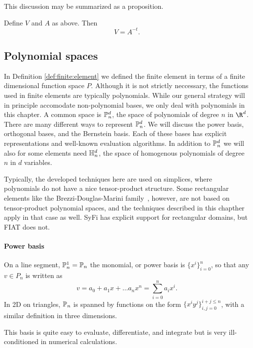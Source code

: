 This discussion may be summarized as a proposition.
\begin{proposition}
Define \( V \) and \( A \) as above.  Then
\begin{equation}
V = A^{-t}.
\end{equation}
\end{proposition}

\subsection{Polynomial spaces}
In Definition \ref{def:finite:element} we defined the finite element in terms
of a finite dimensional function space $P$. Although it is not strictly
neccessary,
the functions used in finite elements are typically polynomials.
While our general strategy will in principle accomodate non-polynomial bases, we
only deal with polynomials in this chapter.
A common space is
$\P_n^d$, the space of polynomials of degree $n$ in $\R^d$. There
are many different ways to represent $\P^d_n$. We will discuss the power
basis, orthogonal bases, and the Bernstein basis.  Each of these bases
has explicit representations and well-known evaluation algorithms.
In addition to $\P^d_n$ we will also for some
elements need $\H^d_n$, the space of homogenous polynomials of degree
\( n \) in \( d \) variables.

Typically, the developed techniques here
are used on simplices, where polynomials do not have a nice
tensor-product structure.  Some rectangular elements like the
Brezzi-Douglas-Marini family~\cite{missing}, however, are not based on
tensor-product polynomial spaces, and the techniques described
in this chapther apply in that
case as well.  SyFi has explicit support for rectangular domains, but
FIAT does not.

\paragraph{Power basis}
On a line segment, $\P_n^1=\P_n$ the monomial, or power basis is
\( \{ x^i \}_{i=0}^{n} \), so that any \( v \in P_n \) is written as
\begin{equation}
\label{pn1d}
v = a_0 + a_1 x + \ldots a_n x^n = \sum^n_{i=0} a_i x^i.
\end{equation}
In 2D on triangles, $\P_n$ is spanned by functions on the form
\( \{ x^i y^j \}_{i,j=0}^{i+j\leq n} \), with a similar definition in
three dimensions.

This basis is quite easy to evaluate, differentiate, and
integrate but is very ill-conditioned in numerical calculations.

